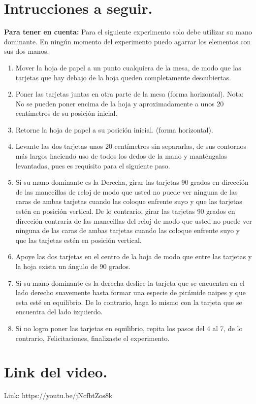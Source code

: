 \documentclass{article}
\begin{document}
\section{Intrucciones a seguir.} \label{contenido}
\textbf{Para tener en cuenta:}  Para el siguiente experimento solo debe utilizar su mano dominante. En ningún momento del experimento puedo agarrar los elementos con sus dos manos.
\begin{enumerate}
  \item Mover la hoja de papel a un punto cualquiera de la mesa, de modo que las tarjetas que hay debajo de la hoja queden completamente descubiertas.
  \item Poner las tarjetas juntas en otra parte de la mesa (forma horizontal). Nota: No se pueden poner encima de la hoja y aproximadamente a unos 20 centímetros de su posición inicial.
  \item Retorne la hoja de papel a su posición inicial. (forma horizontal).
  \item Levante las dos tarjetas unos 20 centímetros sin separarlas, de sus contornos más largos haciendo uso de todos los dedos de la mano y manténgalas levantadas, pues es requisito para el siguiente paso.
  \item Si su mano dominante es la Derecha, girar las tarjetas 90 grados en dirección de las manecillas de reloj de modo que usted no puede ver ninguna de las caras de ambas tarjetas cuando las coloque enfrente suyo y que las tarjetas estén en posición vertical. De lo contrario, girar las tarjetas 90 grados en dirección contraria de las manecillas del reloj de modo que usted no puede ver ninguna de las caras de ambas tarjetas cuando las coloque enfrente suyo y que las tarjetas estén en posición vertical.
  \item Apoye las dos tarjetas en el centro de la hoja de modo que entre las tarjetas y la hoja exista un ángulo de 90 grados.
  \item Si su mano dominante es la derecha deslice la tarjeta que se encuentra en el lado derecho suavemente hasta formar una especie de pirámide naipes y que esta esté en equilibrio. De lo contrario, haga lo mismo con la tarjeta que se encuentra del lado izquierdo.
  \item Si no logro poner las tarjetas en equilibrio, repita los pasos del 4 al 7, de lo contrario, Felicitaciones, finalizaste el experimento.
\end{enumerate}
\cite{list_latex}
\section{Link del video.} \label{Link del video}
Link: https://youtu.be/jNcfbtZos8k
\end{document}
